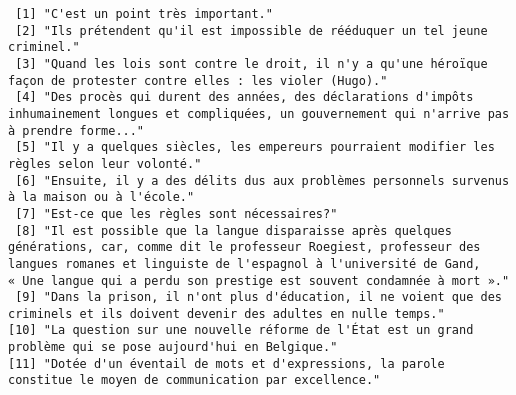 \documentclass[
]{article}
\begin{document}
\begin{verbatim}
 [1] "C'est un point très important."                                                                                                                                                                                                                                      
 [2] "Ils prétendent qu'il est impossible de rééduquer un tel jeune criminel."                                                                                                                                                                                             
 [3] "Quand les lois sont contre le droit, il n'y a qu'une héroïque façon de protester contre elles : les violer (Hugo)."                                                                                                                                                  
 [4] "Des procès qui durent des années, des déclarations d'impôts inhumainement longues et compliquées, un gouvernement qui n'arrive pas à prendre forme..."                                                                                                               
 [5] "Il y a quelques siècles, les empereurs pourraient modifier les règles selon leur volonté."                                                                                                                                                                           
 [6] "Ensuite, il y a des délits dus aux problèmes personnels survenus à la maison ou à l'école."                                                                                                                                                                          
 [7] "Est-ce que les règles sont nécessaires?"                                                                                                                                                                                                                             
 [8] "Il est possible que la langue disparaisse après quelques générations, car, comme dit le professeur Roegiest, professeur des langues romanes et linguiste de l'espagnol à l'université de Gand, « Une langue qui a perdu son prestige est souvent condamnée à mort »."
 [9] "Dans la prison, il n'ont plus d'éducation, il ne voient que des criminels et ils doivent devenir des adultes en nulle temps."                                                                                                                                        
[10] "La question sur une nouvelle réforme de l'État est un grand problème qui se pose aujourd'hui en Belgique."                                                                                                                                                           
[11] "Dotée d'un éventail de mots et d'expressions, la parole constitue le moyen de communication par excellence."                                                                                                                                                         
\end{verbatim}
\end{document}

